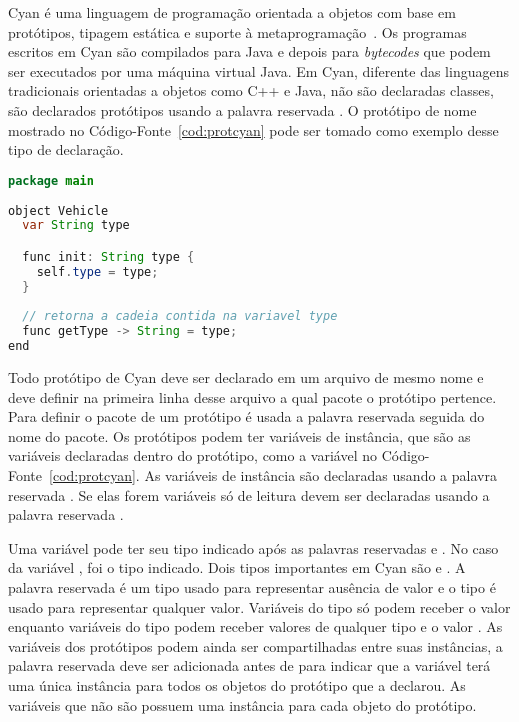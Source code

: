Cyan é uma linguagem de programação orientada a objetos com base em protótipos, tipagem estática e suporte à metaprogramação~\cite{guimaraes2013cyan}. Os programas escritos em Cyan são compilados para Java e depois para \emph{bytecodes} que podem ser executados por uma máquina virtual Java. Em Cyan, diferente das linguagens tradicionais orientadas a objetos como C++ e Java, não são declaradas classes, são declarados protótipos usando a palavra reservada . O protótipo de nome  mostrado no Código-Fonte~\ref{cod:protcyan} pode ser tomado como exemplo desse tipo de declaração.

\begin{lstlisting}[language=Java, caption={Definição de Protótipo em Cyan}, label={cod:protcyan}]
package main
  
object Vehicle
  var String type

  func init: String type { 
    self.type = type;
  }
  
  // retorna a cadeia contida na variavel type
  func getType -> String = type;
end
\end{lstlisting}

Todo protótipo de Cyan deve ser declarado em um arquivo de mesmo nome e deve definir na primeira linha desse arquivo a qual pacote o protótipo pertence. Para definir o pacote de um protótipo é usada a palavra reservada  seguida do nome do pacote. Os protótipos podem ter variáveis de instância, que são as variáveis declaradas dentro do protótipo, como a variável  no Código-Fonte~\ref{cod:protcyan}. As variáveis de instância são declaradas usando a palavra reservada . Se elas forem variáveis só de leitura devem ser declaradas usando a palavra reservada .

Uma variável pode ter seu tipo indicado após as palavras reservadas  e . No caso da variável ,  foi o tipo indicado. Dois tipos importantes em Cyan são  e . A palavra reservada  é um tipo usado para representar ausência de valor e o tipo  é usado para representar qualquer valor. Variáveis do tipo  só podem receber o valor  enquanto variáveis do tipo  podem receber valores de qualquer tipo e o valor . As variáveis dos protótipos podem ainda ser compartilhadas entre suas instâncias, a palavra reservada  deve ser adicionada antes de  para indicar que a variável terá uma única instância para todos os objetos do protótipo que a declarou. As variáveis que não são  possuem uma instância para cada objeto do protótipo.

